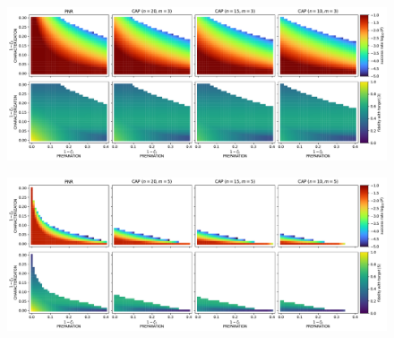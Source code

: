 \documentclass{article}
\begin{document}
\begin{figure}[h]
  \begin{center}
    \includegraphics[width = \columnwidth]{import/202411/paper_unified_03.pdf}
  \end{center}
  \caption{
  }
  \label{f-otm-3}
\end{figure}

\begin{figure}[h]
  \begin{center}
    \includegraphics[width = \columnwidth]{import/202411/paper_unified_05.pdf}
  \end{center}
  \caption{
  }
  \label{f-otm-5}
\end{figure}
\end{document}
